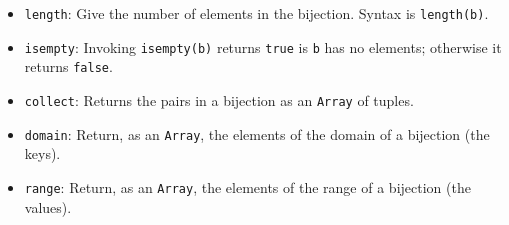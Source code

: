 \documentclass[12pt,oneside]{amsart}
\begin{document}
\begin{itemize}
\item \verb|length|: Give the number of elements in the
  bijection. Syntax is \verb|length(b)|. 

\item \verb|isempty|: Invoking \verb|isempty(b)| returns \verb|true|
  is \verb|b| has no elements; otherwise it returns \verb|false|. 

\item \verb|collect|: Returns the pairs in a bijection as an
  \verb|Array| of tuples.

\item \verb|domain|: Return, as an \verb|Array|, the elements of the
  domain of a bijection (the keys).

\item \verb|range|: Return, as an \verb|Array|, the elements of the
  range of a bijection (the values). 

\end{itemize}
\end{document}
